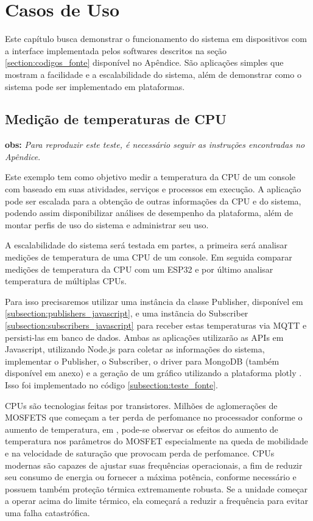 \chapter{Casos de Uso}
\label{chapter:casos_de_uso}

Este capítulo busca demonstrar o funcionamento do sistema em dispositivos com a interface implementada pelos softwares descritos na seção \ref{section:codigos_fonte} disponível no Apêndice. São aplicações simples que mostram a facilidade e a escalabilidade do sistema, além de demonstrar como o sistema pode ser implementado em plataformas.

\section{Medição de temperaturas de CPU}
\label{section:temp_cpu}

\textbf{obs:} \textit{Para reproduzir este teste, é necessário seguir as instruções encontradas no Apêndice}.

Este exemplo tem como objetivo medir a temperatura da CPU de um console com baseado em suas atividades, serviços e processos em execução. A aplicação pode ser escalada para a obtenção de outras informações da CPU e do sistema, podendo assim disponibilizar análises de desempenho da plataforma, além de montar perfis de uso do sistema e administrar seu uso.

A escalabilidade do sistema será testada em partes, a primeira será analisar medições de temperatura de uma CPU de um console. Em seguida comparar medições de temperatura da CPU com um ESP32 e por último analisar temperatura de múltiplas CPUs.

Para isso precisaremos utilizar uma instância da classe Publisher, disponível em  \ref{subsection:publishers_javascript}, e uma instãncia do Subscriber \ref{subsection:subscribers_javascript} para receber estas temperaturas via MQTT e persisti-las em banco de dados. Ambas as aplicações utilizarão as APIs em Javascript, utilizando Node.js para coletar as informações do sistema, implementar o Publisher, o Subscriber, o driver para MongoDB (também disponível em anexo) e a geração de um gráfico utilizando a plataforma plotly \cite{plotly}. Isso foi implementado no código \ref{subsection:teste_fonte}.

CPUs são tecnologias feitas por transistores. Milhões de aglomerações de MOSFETS que começam a  ter perda de perfomance no processador conforme o aumento de temperatura, em \cite{jose}, pode-se observar os efeitos do aumento de  temperatura nos parâmetros do MOSFET especialmente na queda de mobilidade e na velocidade de saturação que provocam perda de perfomance. CPUs modernas são capazes de ajustar suas frequências operacionais, a fim de reduzir seu consumo de energia ou fornecer a máxima potência, conforme necessário e possuem também  proteção térmica extremamente robusta. Se a unidade começar a operar acima do limite térmico, ela começará a reduzir a frequência para evitar uma falha catastrófica.

